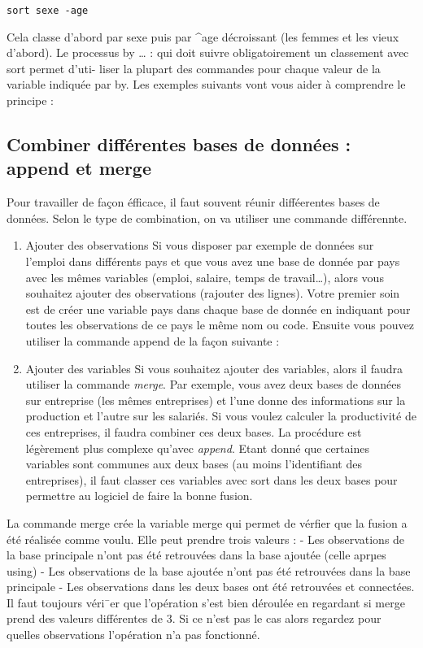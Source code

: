\documentclass[
]{book}
\begin{document}
\texttt{sort\ sexe\ -age}

Cela classe d'abord par sexe puis par \^{}age décroissant (les femmes et les vieux d'abord).
Le processus by \ldots{} : qui doit suivre obligatoirement un classement avec sort permet d'uti-
liser la plupart des commandes pour chaque valeur de la variable indiquée par by. Les exemples
suivants vont vous aider à comprendre le principe :

\hypertarget{combiner-diffuxe9rentes-bases-de-donnuxe9es-append-et-merge}{%
\subsection{Combiner différentes bases de données : append et merge}\label{combiner-diffuxe9rentes-bases-de-donnuxe9es-append-et-merge}}

Pour travailler de façon éfficace, il faut souvent réunir difféerentes bases de données. Selon le type de combination, on va utiliser une commande différennte.

\begin{enumerate}
\def\labelenumi{(\arabic{enumi})}
\item
  Ajouter des observations Si vous disposer par exemple de données sur l'emploi dans différents pays et que vous avez une base de donnée par pays avec les mêmes variables (emploi, salaire, temps de travail\ldots), alors vous souhaitez ajouter des observations (rajouter des lignes). Votre premier soin est de créer une variable pays dans chaque base de donnée en indiquant pour toutes les observations de ce pays le même nom ou code. Ensuite vous pouvez utiliser la commande append de la façon suivante :
\item
  Ajouter des variables Si vous souhaitez ajouter des variables, alors il faudra utiliser la commande \emph{merge}. Par exemple, vous avez deux bases de données sur entreprise (les mêmes
  entreprises) et l'une donne des informations sur la production et l'autre sur les salariés. Si vous voulez calculer la productivité de ces entreprises, il faudra combiner ces deux bases. La procédure est légèrement plus complexe qu'avec \emph{append}. Etant donné que certaines variables sont communes aux deux bases (au moins l'identifiant des entreprises), il faut classer ces variables avec sort dans les deux bases pour permettre au logiciel de faire la bonne fusion.
\end{enumerate}

La commande merge crée la variable merge qui permet de vérfier que la fusion a été réalisée comme voulu. Elle peut prendre trois valeurs :
- Les observations de la base principale n'ont pas été retrouvées dans la base ajoutée
(celle aprµes using)
- Les observations de la base ajoutée n'ont pas été retrouvées dans la base principale
- Les observations dans les deux bases ont été retrouvées et connectées.
Il faut toujours véri¯er que l'opération s'est bien déroulée en regardant si merge prend des valeurs différentes de 3. Si ce n'est pas le cas alors regardez pour quelles observations l'opération n'a pas fonctionné.
\end{document}
